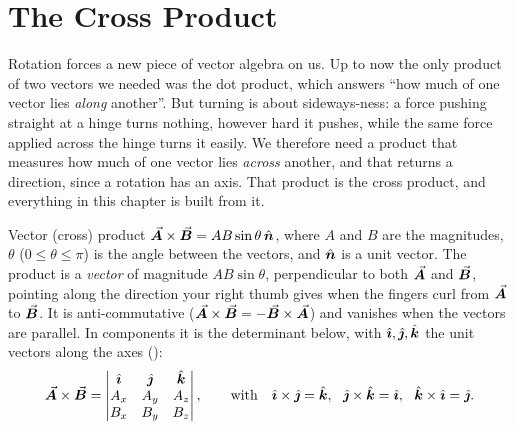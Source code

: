 \section{The Cross Product}
Rotation forces a new piece of vector algebra on us. Up to now the only product of two vectors we needed was the dot
product, which answers ``how much of one vector lies \emph{along} another''. But turning is about
sideways-ness: a force pushing straight at a hinge turns nothing, however hard it pushes, while the same
force applied across the hinge turns it easily. We therefore need a product that measures how much of
one vector lies \emph{across} another, and that returns a direction, since a rotation has an axis. That
product is the cross product, and everything in this chapter is built from it.

\begin{defbox}{Vector (cross) product}
$\vec{\bm{A}}\times\vec{\bm{B}}=AB\sin\theta\,\hat{\bm{n}}$, where $A$ and $B$ are the magnitudes, $\theta$ ($0\le\theta\le\pi$) is
the angle between the vectors, and $\hat{\bm{n}}$ is a unit vector. The product is a \emph{vector} of magnitude $AB\sin\theta$, perpendicular to both $\vec{\bm{A}}$
and $\vec{\bm{B}}$, pointing along the direction your right thumb gives when the fingers curl from $\vec{\bm{A}}$ to $\vec{\bm{B}}$. It
is anti-commutative ($\vec{\bm{A}}\times\vec{\bm{B}}=-\vec{\bm{B}}\times\vec{\bm{A}}$) and vanishes when the vectors are parallel. In components it is
the determinant below, with $\hat{\bm{\imath}},\hat{\bm{\jmath}},\hat{\bm{k}}$ the unit vectors along the axes ():
\[
\A\ex\B=\begin{vmatrix}\ihat & \jhat & \khat\\ A_x & A_y & A_z\\ B_x & B_y & B_z\end{vmatrix},
\qquad\text{with}\quad \ihat\ex\jhat=\khat,\ \ \jhat\ex\khat=\ihat,\ \ \khat\ex\ihat=\jhat.
\]
\end{defbox}

\begin{figure}[htbp]
\centering
{}
\end{figure}

